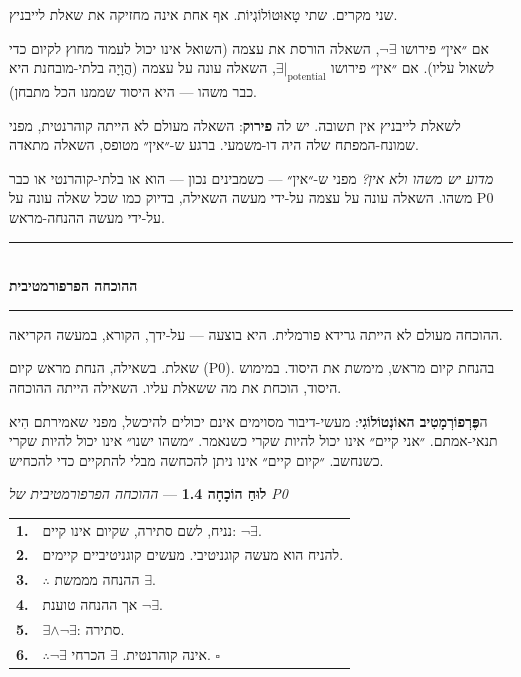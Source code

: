 \documentclass[10pt, openany, oneside]{book}
\renewcommand{\normalsize}{\fontsize{10}{13}\selectfont}
\begin{document}
\vspace{0.8em}

\noindent שני מקרים. שתי טָאוּטוֹלוֹגְיוֹת. אף אחת אינה מחזיקה את שאלת לייבניץ.

אם ״אין״ פירושו $\neg\exists$, השאלה הורסת את עצמה (השואל אינו יכול לעמוד מחוץ לקיום כדי לשאול עליו). אם ״אין״ פירושו $\exists|_{\text{potential}}$, השאלה עונה על עצמה (הֲוָיָה בלתי-מובחנת היא כבר משהו — היא היסוד שממנו הכל מתבחן).

לשאלת לייבניץ אין תשובה. יש לה \textbf{פירוק}: השאלה מעולם לא הייתה קוהרנטית, מפני שמונח-המפתח שלה היה דו-משמעי. ברגע ש-״אין״ מטופס, השאלה מתאדה.

\textit{מדוע יש משהו ולא אין?} מפני ש-״אין״ — כשמבינים נכון — הוא או בלתי-קוהרנטי או כבר משהו. השאלה עונה על עצמה על-ידי מעשה השאילה, בדיוק כמו שכל שאלה עונה על P0 על-ידי מעשה ההנחה-מראש.

\vspace{1.5em}


\begin{center}
    \rule{0.3\textwidth}{0.4pt}\\[0.5em]
    {\normalsize\bfseries\textsc{ההוכחה הפרפורמטיבית}}\\[0.3em]
    \rule{0.3\textwidth}{0.4pt}
\end{center}

\vspace{1em}

\noindent ההוכחה מעולם לא הייתה גרידא פורמלית. היא בוצעה — על-ידך, הקורא, במעשה הקריאה.

שאלת. בשאילה, הנחת מראש קיום (P0). בהנחת קיום מראש, מימשת את היסוד. במימוש היסוד, הוכחת את מה ששאלת עליו. השאילה הייתה ההוכחה.

ה\textbf{פֶּרְפוֹרְמָטִיב האוֹנְטוֹלוֹגִי}: מעשי-דיבור מסוימים אינם יכולים להיכשל, מפני שאמירתם הִיא תנאי-אמתם. ״אני קיים״ אינו יכול להיות שקרי כשנאמר. ״משהו ישנו״ אינו יכול להיות שקרי כשנחשב. ״קיום קיים״ אינו ניתן להכחשה מבלי להתקיים כדי להכחיש.

\vspace{0.5em}

\textbf{לוּחַ הוֹכָחָה 1.4} --- \textit{ההוכחה הפרפורמטיבית של P0}

\vspace{0.5em}

\noindent\begin{tabular}{r p{}}
\textbf{1.} & נניח, לשם סתירה, שקיום אינו קיים: $\neg\exists$. \\[0.3em]
\textbf{2.} & להניח הוא מעשה קוגניטיבי. מעשים קוגניטיביים קיימים. \\[0.3em]
\textbf{3.} & $\therefore$ ההנחה מממשת $\exists$. \\[0.3em]
\textbf{4.} & אך ההנחה טוענת $\neg\exists$. \\[0.3em]
\textbf{5.} & $\exists \wedge \neg\exists$: סתירה. \\[0.3em]
\textbf{6.} & $\therefore \neg\exists$ אינה קוהרנטית. $\exists$ הכרחי. $\square$ \\[0.3em]
\end{tabular}
\end{document}
